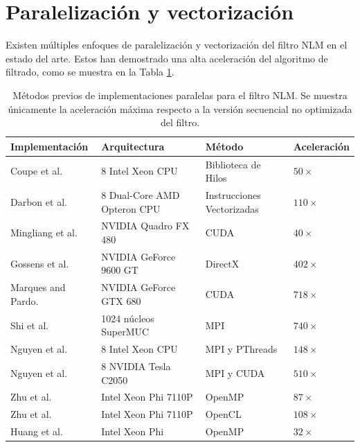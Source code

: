 \section{Paralelización y vectorización}
\label{ch:marco_parallel}

Existen múltiples enfoques de paralelización y vectorización del filtro NLM en el estado del arte. Estos han demostrado una alta aceleración del algoritmo de filtrado, como se muestra en la Tabla \ref{method_table}. 


\begin{table}[htb]
\caption[Estado del arte en paralelizaciones del filtro NLM]{Métodos previos de implementaciones paralelas para el filtro NLM. Se muestra únicamente la aceleración máxima respecto a la versión secuencial no optimizada del filtro.}
\begin{tabularx}{1\linewidth}{X X X X} 
\hline
Implementación & Arquitectura & Método & Aceleración \\ [0.5ex]
 \hline\hline
 Coupe et al. \cite{coupe2006fast} &  8 Intel Xeon CPU & Biblioteca de Hilos & $50\times$\\
 Darbon et al. \cite{Darbon2008} &  8 Dual-Core AMD Opteron CPU & Instrucciones Vectorizadas & $110\times$\\
 Mingliang et al. \cite{mingliang2016medical} &  NVIDIA Quadro FX 480 & CUDA & $40\times$\\
Gossens et al. \cite{goossens2010gpu} &  NVIDIA GeForce 9600 GT & DirectX & $402\times$\\
Marques and Pardo. \cite{marques2013implementation} &  NVIDIA GeForce GTX 680 & CUDA & $718\times$\\ 
Shi et al. \cite{shi2015optimized} &   1024 núcleos SuperMUC & MPI & $740\times$\\
Nguyen et al. \cite{nguyen2016medical} &   8 Intel Xeon CPU & MPI y PThreads & $148\times$\\
Nguyen et al. \cite{nguyen2016medical} &   8 NVIDIA Tesla C2050 & MPI y CUDA & $510\times$\\
Zhu et al. \cite{zhu2016parallel} &  Intel Xeon Phi 7110P & OpenMP & $87\times$\\
Zhu et al. \cite{zhu2016parallel} &  Intel Xeon Phi 7110P & OpenCL & $108\times$\\
Huang et al. \cite{huang2017parallel} &  Intel Xeon Phi & OpenMP & $32\times$\\
\end{tabularx}
\label{method_table}
\end{table}


